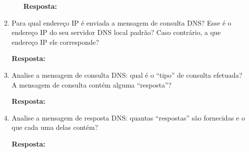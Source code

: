 \documentclass[12pt,a4paper]{report}
\begin{document}
\begin{enumerate}
\begin{enumerate}
			\textbf{Resposta:}
		\end{enumerate}

		\item Para qual endereço IP é enviada a mensagem de consulta DNS? Esse é o endereço IP do seu servidor DNS local padrão? Caso contrário, a que endereço IP ele corresponde?
		
		\textbf{Resposta:}

		\item Analise a mensagem de consulta DNS: qual é o “tipo” de consulta efetuada? A mensagem de consulta contém alguma “resposta”?
		
		\textbf{Resposta:}

		\item Analise a mensagem de resposta DNS: quantas “respostas” são fornecidas e o que cada uma delas contém?
		
		\textbf{Resposta:}
		
	\end{enumerate} 
\end{document}
